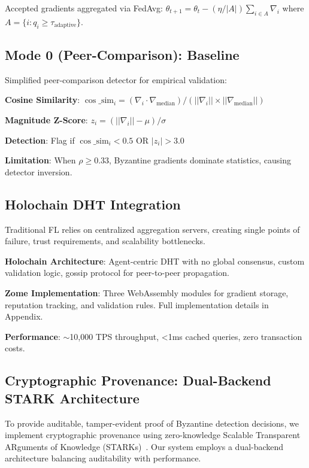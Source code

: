 Accepted gradients aggregated via FedAvg: $\theta_{t+1} = \theta_t - (\eta / |A|) \sum_{i \in A} \nabla_i$ where $A = \{i : q_i \geq \tau_{\text{adaptive}}\}$.

\subsection{Mode 0 (Peer-Comparison): Baseline}

Simplified peer-comparison detector for empirical validation:

\textbf{Cosine Similarity}: $\cos\_\text{sim}_i = (\nabla_i \cdot \nabla_{\text{median}}) / (||\nabla_i|| \times ||\nabla_{\text{median}}||)$

\textbf{Magnitude Z-Score}: $z_i = (||\nabla_i|| - \mu) / \sigma$

\textbf{Detection}: Flag if $\cos\_\text{sim}_i < 0.5$ OR $|z_i| > 3.0$

\textbf{Limitation}: When $\rho \geq 0.33$, Byzantine gradients dominate statistics, causing detector inversion.

\subsection{Holochain DHT Integration}

Traditional FL relies on centralized aggregation servers, creating single points of failure, trust requirements, and scalability bottlenecks.

\textbf{Holochain Architecture}: Agent-centric DHT with no global consensus, custom validation logic, gossip protocol for peer-to-peer propagation.

\textbf{Zome Implementation}: Three WebAssembly modules for gradient storage, reputation tracking, and validation rules. Full implementation details in Appendix.

\textbf{Performance}: $\sim$10,000 TPS throughput, <1ms cached queries, zero transaction costs.

\subsection{Cryptographic Provenance: Dual-Backend STARK Architecture}

To provide auditable, tamper-evident proof of Byzantine detection decisions, we implement cryptographic provenance using zero-knowledge Scalable Transparent ARguments of Knowledge (STARKs)~\cite{bensasson2018scalable}. Our system employs a dual-backend architecture balancing auditability with performance.

